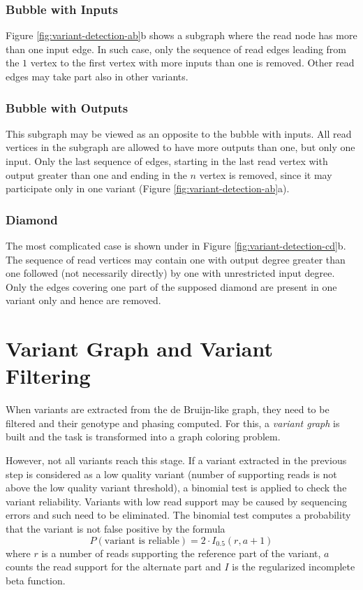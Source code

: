 \subsubsection{Bubble with Inputs}
\label{subsec:bubble-with-inputs}

Figure \ref{fig:variant-detection-ab}b shows a subgraph where the read node has more than one input edge. In such case, only the sequence of read edges leading from the $1$ vertex to the first vertex with more inputs than one is removed. Other read edges may take part also in other variants.

\subsubsection{Bubble with Outputs}
\label{subsec:bubble-with-outputs}

This subgraph may be viewed as an opposite to the bubble with inputs. All read vertices in the subgraph are allowed to have more outputs than one, but only one input. Only the last sequence of edges, starting in the last read vertex with output greater than one and ending in the $n$ vertex is removed, since it may participate only in one variant (Figure \ref{fig:variant-detection-ab}a).

\subsubsection{Diamond}
\label{subsec:diamond}

The most complicated case is shown under in Figure \ref{fig:variant-detection-cd}b. The sequence of read vertices may contain one with output degree greater than one followed (not necessarily directly) by one with unrestricted input degree. Only the edges covering one part of the supposed diamond are present in one variant only and hence are removed. 

\section{Variant Graph and Variant Filtering}
\label{sec:variant-graph-and-variant-filtering}

When variants are extracted from the de Bruijn-like graph, they need to be filtered and their genotype and phasing computed. For this, a \textit{variant graph} is built and the task is transformed into a graph coloring problem.

However, not all variants reach this stage. If a variant extracted in the previous step is considered as a low quality variant (number of supporting reads is not above the low quality variant threshold), a binomial test is applied to check the variant reliability. Variants with low read support may be caused by sequencing errors and such need to be eliminated. The binomial test computes a probability that the variant is not false positive by the formula
$$
P(\text{variant is reliable}) = 2 \cdot I_{0.5} (r, a + 1)
$$
where $r$ is a number of reads supporting the reference part of the variant, $a$ counts the read support for the alternate part and $I$ is the regularized incomplete beta function. 

